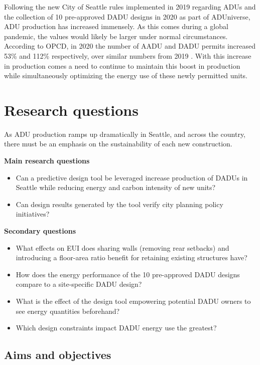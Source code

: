 Following the new City of Seattle rules implemented in 2019 regarding ADUs and the collection of 10 pre-approved DADU designs in 2020 as part of ADUniverse, ADU production has increased immensely. As this comes during a global pandemic, the values would likely be larger under normal circumstances. According to OPCD, in 2020 the number of AADU and DADU permits increased 53\% and 112\% respectively, over similar numbers from 2019 \cite{welchAccessoryDwellingUnits2021}. With this increase in production comes a need to continue to maintain this boost in production while simultaneously optimizing the energy use of these newly permitted units.



\section{Research questions}

As ADU production ramps up dramatically in Seattle, and across the country, there must be an emphasis on the sustainability of each new construction. 

\bf{Main research questions}
\begin{itemize}
	\item Can a predictive design tool be leveraged increase production of DADUs in Seattle while reducing energy and carbon intensity of new units?
	\item Can design results generated by the tool verify city planning policy initiatives?
\end{itemize}

\bf{Secondary questions}
\begin{itemize}
	\item What effects on EUI does sharing walls (removing rear setbacks) and introducing a floor-area ratio benefit for retaining existing structures have?
	\item How does the energy performance of the 10 pre-approved DADU designs compare to a site-specific DADU design?
	\item What is the effect of the design tool empowering potential DADU owners to see energy quantities beforehand?
	\item Which design constraints impact DADU energy use the greatest?
\end{itemize}


\subsection{Aims and objectives}

